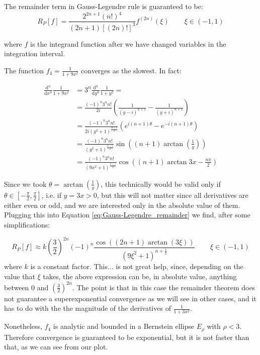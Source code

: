 \documentclass[a4paper,11]{article}
\begin{document}
The remainder term in Gauss-Legendre rule is guaranteed to be:
\begin{equation}\label{eq:Gauss-Legendre_remainder}
    R_P[f]=\frac{2^{2n+1}(n!)^4}{(2n+1)[(2n)!]^3}f^{(2n)}(\xi)\,
    \qquad
    \xi\in(-1,1)
\end{equation}

where $f$ is the integrand function after we have changed variables in 
the integration interval.

The function $f_{4} = \frac{1}{1+9x^{2}}$ converges as the slowest. In fact:

\[
	\begin{aligned}
		\frac{\mathrm d^{n}}{\mathrm d x^{n}} \frac{1}{1+9x^{2}} &= 
			3^{n} \frac{\mathrm d^{n}}{\mathrm d y^{n}} \frac{1}{1+y^{2}} =\\
		& = \frac{(-1)^{n}3^{n}n!}{2i}\left( \frac{1}{(y-i)^{n+1}}
			- \frac{1}{(y+i)^{n+1}}\right) \\
		& = \frac{(-1)^{n}3^{n}n!}{2i(y^{2}+1)^{\frac{n+1}{2}}}
			\left( e^{i(n+1)\theta} - e^{-i(n+1)\theta}\right) \\
		& = \frac{(-1)^{n}3^{n}n!}{(y^{2}+1)^{\frac{n+1}{2}}}
			\sin\left((n+1)\arctan\left(\frac{1}{y}\right)\right) \\
		& = \frac{(-1)^{n}3^{n}n!}{(9x^{2}+1)^{\frac{n+1}{2}}}
			\cos\left((n+1)\arctan 3x - \frac{n\pi}{2}\right)
	\end{aligned}
\]

Since we took $\theta = \arctan(\frac{1}{y})$, this technically would be valid 
only if $\theta \in [-\frac{\pi}{2},\frac{\pi}{2}]$, i.e. if $y = 3x > 0$, 
but this will not matter since all derivatives are either even or odd, and 
we are interested only in the absolute value of them.
Plugging this into Equation \ref{eq:Gauss-Legendre_remainder} we find,
after some simplifications:

\[
    R_P[f]\approx k\left(\frac{3}{2}\right)^{2n}(-1)^{n}
	\frac{\cos\left( (2n+1)\arctan(3\xi)\right)}{(9\xi^{2}+1)^{n+\frac{1}{2}}}\,
    \qquad
    \xi\in(-1,1)
\]
where $k$ is a constant factor.
This... is not great help, since, depending on the value that $\xi$ takes,
the above expression can be, in absolute value, anything between 0 and 
$\left(\frac{3}{2}\right)^{2n}$. The point is that in this case the remainder 
theorem does not guarantee a superexponential convergence as we will see
in other cases, and it has to do with the the magnitude of the derivatives of
$\frac{1}{1+3x^{2}}$.

Nonetheless, $f_{4}$ is analytic and bounded in a Bernstein ellipse
$E_{\rho}$ with $\rho < 3$. Therefore convergence is guaranteed to be
exponential, but it is not faster than that, as we can see from our plot.
\end{document}

